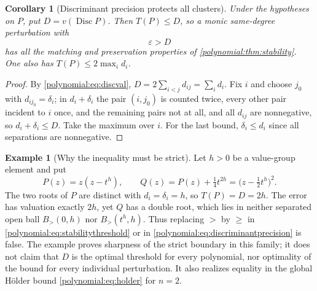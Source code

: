 \documentclass[11pt,letterpaper]{article}
\numberwithin{equation}{section}
\newtheorem{corollary}[theorem]{Corollary}
\theoremstyle{definition}
\newtheorem{example}[theorem]{Example}
\theoremstyle{remark}\newtheorem{remark}[theorem]{Remark}
\newcommand{\Disc}{\operatorname{Disc}}
\newcommand{\Bgt}[2]{B_{>}(#1,#2)}
\begin{document}
\begin{corollary}[Discriminant precision protects all clusters]
\label{polynomial:cor:discprecision}
Under the hypotheses on $P$, put $D=v(\Disc P)$. Then $T(P)\le D$, so a monic
same-degree perturbation with
\begin{equation}\label{polynomial:eq:discriminantprecision}
 \varepsilon>D
\end{equation}
has all the matching and preservation properties of
\cref{polynomial:thm:stability}. One also has $T(P)\le2\max_id_i$.
\end{corollary}
\begin{proof}
By \eqref{polynomial:eq:discval}, $D=2\sum_{i<j}d_{ij}=\sum_i d_i$. Fix $i$
and choose $j_0$ with $d_{ij_0}=\delta_i$; in $d_i+\delta_i$ the pair
$(i,j_0)$ is counted twice, every other pair incident to $i$ once, and the
remaining pairs not at all, and all $d_{ij}$ are nonnegative, so
$d_i+\delta_i\le D$. Take the maximum over $i$. For the last bound,
$\delta_i\le d_i$ since all separations are nonnegative.
\end{proof}

\begin{example}[Why the inequality must be strict]\label{polynomial:ex:sharpdisc}
Let $h>0$ be a value-group element and put
\[
 P(z)=z(z-t^h),\qquad Q(z)=P(z)+\tfrac14t^{2h}=\bigl(z-\tfrac12t^h\bigr)^2 .
\]
The two roots of $P$ are distinct with $d_i=\delta_i=h$, so
$T(P)=D=2h$. The error has valuation exactly $2h$, yet $Q$ has a double root,
which lies in neither separated open ball $\Bgt0h$ nor $\Bgt{t^h}h$. Thus
replacing $>$ by $\ge$ in \eqref{polynomial:eq:stabilitythreshold} or in
\eqref{polynomial:eq:discriminantprecision} is false. The example proves
sharpness of the strict boundary in this family; it does not claim that $D$ is
the optimal threshold for every polynomial, nor optimality of the bound for
every individual perturbation. It also realizes equality in the global
H\"older bound \eqref{polynomial:eq:holder} for $n=2$.
\end{example}
\end{document}
